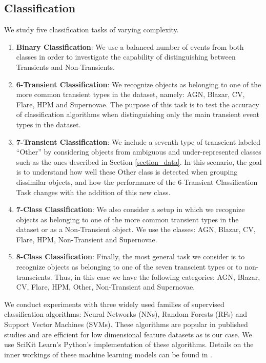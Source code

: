 \documentclass[a4paper,fleqn,usenatbib]{mnras}
\begin{document}
\subsection{Classification} \label{subsection_classification}

We study five classification tasks of varying complexity.

\begin{enumerate}
    \item \textbf{Binary Classification}: 
      We use a balanced number of events from both classes in order 
      to investigate the capability of distinguishing between Transients
      and Non-Transients.
    \item \textbf{6-Transient Classification}: We recognize objects as
      belonging to one of the more common transient types in the dataset,
      namely: AGN, Blazar, CV, Flare, HPM and Supernovae. The purpose of
      this task is to test the accuracy of classification algorithms
      when distinguishing only the main transient event types in the
      dataset. 
    \item \textbf{7-Transient Classification}: We include a seventh type 
      of transcient labeled ``Other'' by considering objects
      from ambiguous and under-represented classes such as the ones
      described in Section \ref{section_data}. In this scenario, the goal is
      to understand how well these Other class is detected when
      grouping dissimilar objects, and how the performance of the 6-Transient
      Classification Task changes with the addition of this new class. 
    \item \textbf{7-Class Classification}: We also consider a setup in which we recognize objects as
      belonging to one of the more common transient types in the
      dataset or as a Non-Transient object. We use the classes:
      AGN, Blazar, CV, Flare, HPM, Non-Transient and Supernovae. 
    \item \textbf{8-Class Classification}: Finally, the most general task we consider is to recognize objects as
      belonging to one of the seven transcient types or to non-transcients. Thus, in this case we have the following categories: AGN, Blazar, CV,
      Flare, HPM, Other, Non-Transient and Supernovae. 
\end{enumerate}

We conduct experiments with three widely used families of supervised classification 
algorithms: Neural Networks (NNs), Random Forests (RFs) and Support Vector Machines (SVMs).
These algorithms are popular in published studies and are efficient 
for low dimensional feature datasets as is our case. 
We use SciKit Learn's \citep{1201.0490} Python's implementation of these algorithms.
Details on the inner workings of these machine learning models can be
found in \cite{9780387848570}.  
\end{document}
